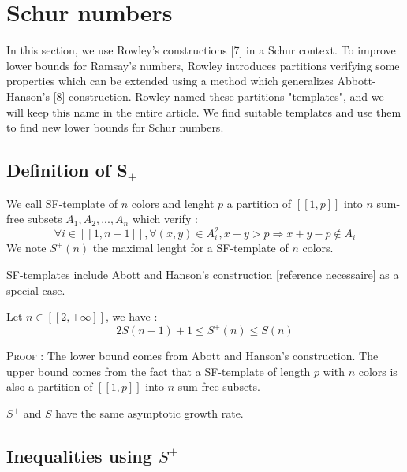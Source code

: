 \section{Schur numbers}

\qquad In this section, we use Rowley's constructions [7] in a Schur context. To improve lower bounds for Ramsay's
numbers, Rowley
introduces partitions verifying some properties which can be extended using a method which generalizes Abbott-Hanson's
[8] construction.
Rowley named these partitions "templates", and we will keep this name in the entire article. We find suitable templates
and use them
 to find new lower bounds for Schur numbers.

\subsection{Definition of S\(_+\)}

\begin{definition}
We call SF-template of \(n\) colors and lenght \(p\) a partition of \( [\![1,p]\!]\) into \(n\) sum-free subsets \(A_1,
A_2, ..., A_n\) which verify :
	\[
	\forall i \in [\![1, n-1]\!], \forall (x,y) \in A_i^2, x+y > p
	\Longrightarrow x+y-p \notin A_i
	\]
	We note \(S^+(n)\) the maximal lenght for a SF-template of \(n\) colors.
\end{definition}

\begin{remark}
	SF-templates include Abott and Hanson's construction [reference necessaire] as a special case.
\end{remark}

\begin{proposition}
	Let \(n \in [\![2, +\infty]\!]\), we have :
	\[
	2S(n-1)+1 \leqslant S^+(n) \leqslant S(n)
	\]
\end{proposition}

\textsc{Proof :} The lower bound comes from Abott and Hanson's construction. The upper bound comes
from the fact that a SF-template of length \(p\) with \(n\) colors is also a partition of
\([\![1, p]\!]\) into \(n\) sum-free subsets.

\begin{remark}
	\(S^+\) and \(S\) have the same asymptotic growth rate.
\end{remark}


\subsection{Inequalities using \(S^+\)}

